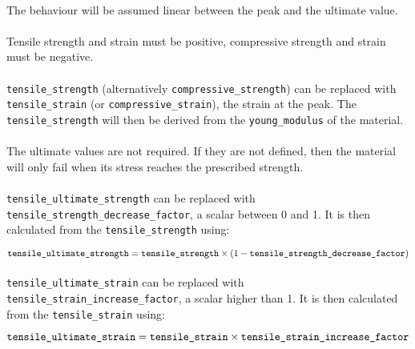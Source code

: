 \documentclass[10pt]{article}
\begin{document}
\paragraph{}The behaviour will be assumed linear between the peak and the ultimate value.

\paragraph{}Tensile strength and strain must be positive, compressive strength and strain must be negative.

\paragraph{}\verb+tensile_strength+ (alternatively \verb+compressive_strength+) can be replaced with \verb+tensile_strain+ (or \verb+compressive_strain+), the strain at the peak. The \verb+tensile_strength+ will then be derived from the \verb+young_modulus+ of the material.

\paragraph{}The ultimate values are not required. If they are not defined, then the material will only fail when its stress reaches the prescribed strength.

\paragraph{}\verb+tensile_ultimate_strength+ can be replaced with \verb+tensile_strength_decrease_factor+, a scalar between 0 and 1. It is then calculated from the \verb+tensile_strength+ using:

\begin{equation}
	\verb+tensile_ultimate_strength+ = \verb+tensile_strength+ \times ( 1 - \verb+tensile_strength_decrease_factor+)
\end{equation} 

\paragraph{}\verb+tensile_ultimate_strain+ can be replaced with \verb+tensile_strain_increase_factor+, a scalar higher than 1. It is then calculated from the \verb+tensile_strain+ using:

\begin{equation}
	\verb+tensile_ultimate_strain+ = \verb+tensile_strain+ \times \verb+tensile_strain_increase_factor+
\end{equation} 
\end{document}
